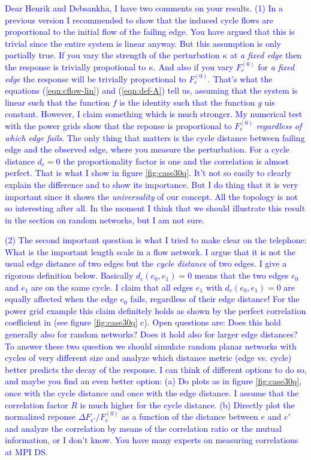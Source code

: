 \documentclass[10pt,aps,pra,twocolumn,superscriptaddress]{revtex4-1}
\newcommand{\dirk}[1]{\textcolor{blue}{#1}}
\begin{document}
\dirk{
Dear Henrik and Debsankha, I have two comments on your results. 
(1) In a previous version I recommended to show that the induced cycle flows are 
proportional to the initial flow of the failing edge. You have argued that this is trivial 
since the entire system is linear anyway. 
But this assumption is only partially true. If you vary the strength of the perturbation
$\kappa$ at \emph{a fixed edge} then the response is trivially propotional to $\kappa$.
And also if you vary $F_e^{(0)}$ for \emph{a fixed edge} the response will be 
trivially proportional to $F_e^{(0)}$. That's what the equations (\ref{eqn:cflow-lin}) 
and (\ref{eqn:def-A}) tell us, assuming that the system is linear such that the function 
$f$ is the identity such that the function $g$ uis constant.
However, I claim something which is much stronger. My numerical test with the power 
grids show that the reponse is proportional to $F_e^{(0)}$ \emph{regardless of which
edge fails}. The only thing that matters is the cycle distance between failing edge and
the observed edge, where you measure the perturbation. For a cycle distance $d_c=0$
the proportionality factor is one and the correlation is almost perfect. That is what I show 
in figure \ref{fig:case30q}.
It't not so easily to clearly explain the difference and to show its importance. But I do thing
that it is very important since it shows the \emph{universality} of our concept. All the 
topology is not so interesting after all. In the moment I think that we should illustrate this
result in the section on random networks, but I am not sure.
}

\dirk{
(2) The second important question is what I tried to make clear on the telephone: What
is the important length scale in a flow network. I argue that it is not the usual edge 
distance of two edges but the \emph{cycle distance} of two edges. I give a rigorous 
definition below. Basically $d_c(e_0,e_1) = 0$ means that the two edges $e_0$ and $e_1$ 
are on the same cycle. I claim that all edges  $e_1$ with $d_c(e_0,e_1) = 0$ are equally 
affected when the edge $e_0$ fails, regardless of their edge distance! For the power grid 
example this claim definitely holds as shown by the perfect correlation coefficient in
(see figure \ref{fig:case30q} c). Open questions are: Does this hold generally also for 
random networks? Does it hold also for larger edge distances? To answer these two question 
we should simulate random planar networks with cycles of very different size and analyze 
which distance metric (edge vs. cycle) better predicts the decay of the response. I can think 
of different options to do so, and maybe you find an even better option:
(a) Do plots as in figure \ref{fig:case30q}, once with the cycle distance and once with
the edge distance. I assume that the correlation factor $R$ is much  higher for the cycle 
distance.  
(b) Directly plot the normalized reponse $\Delta F_{e'}/F^{(0)}_e$ as a function of the
distance between $e$ and $e'$ and analyze the correlation by means of the correlation 
ratio or the mutual information, or I don't know. You have many experts on measuring 
correlations at MPI DS.
}
\end{document}
